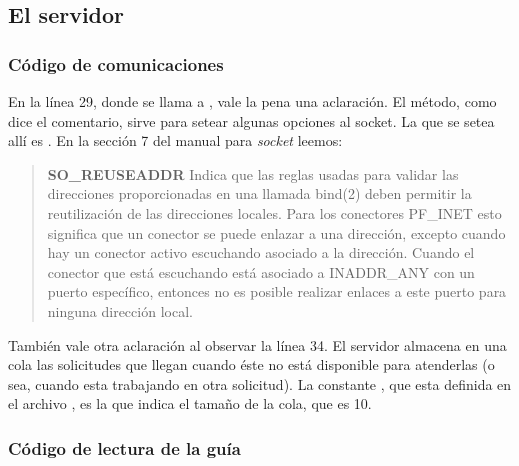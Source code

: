 \subsection{El servidor}


\subsubsection{Código de comunicaciones}

En la línea 29, donde se llama a , vale la pena una
aclaración. El método, como dice el comentario, sirve para setear algunas
opciones al socket. La que se setea allí es . En la
sección 7 del manual para \emph{socket} leemos:

\begin{quote}

\textbf{SO\_REUSEADDR}\linebreak
Indica que las reglas usadas para validar las direcciones proporcionadas en una
llamada bind(2) deben permitir la reutilización  de  las direcciones  locales.
Para  los conectores PF\_INET esto significa que un conector se puede enlazar a
una dirección, excepto cuando hay un conector activo escuchando asociado a la
dirección. Cuando el conector que está escuchando está asociado a INADDR\_ANY
con un puerto específico, entonces no es posible realizar enlaces a este puerto
para ninguna dirección local.

\end{quote}

También vale otra aclaración al observar la línea 34. El servidor almacena en
una cola las solicitudes que llegan cuando éste no está disponible para
atenderlas (o sea, cuando esta trabajando en otra solicitud). La constante
, que esta definida en el archivo , es la
que indica el tamaño de la cola, que es 10.

\subsubsection{Código de lectura de la guía}

